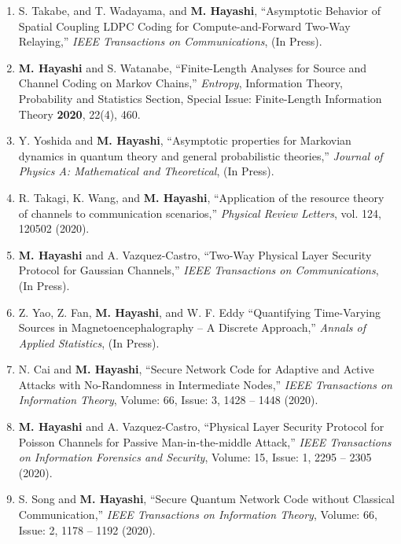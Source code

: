 \documentclass[a4paper,12pt,oneside]{article}
\begin{document}
\begin{enumerate}
\item
S. Takabe, and T. Wadayama, and \textbf{M. Hayashi}, 
``Asymptotic Behavior of Spatial Coupling LDPC Coding for Compute-and-Forward Two-Way Relaying,''
{\em IEEE Transactions on Communications},
(In Press).

\item
\textbf{M. Hayashi} and S. Watanabe,
``Finite-Length Analyses for Source and Channel Coding on Markov Chains,'' 
{\em Entropy}, Information Theory, Probability and Statistics Section, Special Issue: Finite-Length Information Theory  
{\bf 2020}, 22(4), 460.

\item
Y. Yoshida and \textbf{M. Hayashi},
``Asymptotic properties for Markovian dynamics in quantum theory and general probabilistic theories,'' 
{\em Journal of Physics A: Mathematical and Theoretical}, 
(In Press).

\item
R. Takagi, K. Wang, and \textbf{M. Hayashi},
``Application of the resource theory of channels to communication scenarios,'' 
{\em Physical Review Letters}, 
vol. 124, 120502 (2020).

\item 
\textbf{M. Hayashi} and A. Vazquez-Castro,
``Two-Way Physical Layer Security Protocol for
Gaussian Channels,'' 
{\em IEEE Transactions on Communications},
(In Press).

\item 
Z. Yao, Z. Fan, \textbf{M. Hayashi}, and W. F. Eddy
``Quantifying Time-Varying Sources in Magnetoencephalography -- A Discrete Approach,''
{\em Annals of Applied Statistics},
(In Press).

\item 
N. Cai and \textbf{M. Hayashi},
``Secure Network Code for Adaptive and Active Attacks with No-Randomness in Intermediate Nodes,''
{\em IEEE Transactions on Information Theory}, 
Volume: 66, Issue: 3, 1428 -- 1448 (2020). 

\item 
\textbf{M. Hayashi} and A. Vazquez-Castro,
``Physical Layer Security Protocol for Poisson Channels 
for Passive Man-in-the-middle Attack,'' 
{\em IEEE Transactions on Information Forensics and Security},
Volume: 15, Issue: 1, 2295 -- 2305 (2020). 

\item 
S. Song and \textbf{M. Hayashi},
``Secure Quantum Network Code without Classical Communication,''
{\em IEEE Transactions on Information Theory}, 
Volume: 66, Issue: 2, 1178 -- 1192 (2020). 


\end{enumerate}
\end{document}
